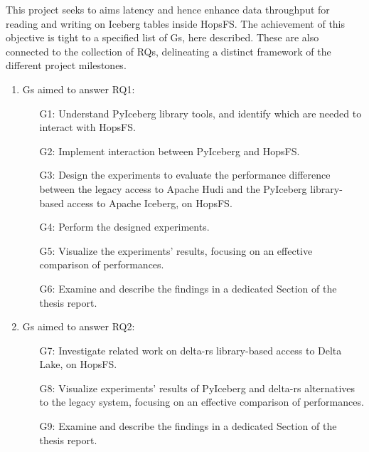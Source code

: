 This project seeks to aims latency and hence enhance data throughput for reading and writing on Iceberg tables inside \gls{HopsFS}. The achievement of this objective is tight to a specified list of \glspl{G}, here described. These are also connected to the collection of \glspl{RQ}, delineating a distinct framework of the different project milestones.

\begin{enumerate}
    \item \glspl{G} aimed to answer RQ1: 
        \begin{enumerate}
            \item[G1:] Understand PyIceberg library tools, and identify which are needed to interact with \gls{HopsFS}.
            \item[G2:] Implement interaction between PyIceberg and \gls{HopsFS}. 
            \item[G3:] Design the experiments to evaluate the performance difference between the legacy access to Apache Hudi and the PyIceberg library-based access to Apache Iceberg, on \gls{HopsFS}. 
            \item[G4:] Perform the designed experiments.
            \item[G5:] Visualize the experiments' results, focusing on an effective comparison of performances.
            \item[G6:] Examine and describe the findings in a dedicated Section of the thesis report.
        \end{enumerate}
    \item \glspl{G} aimed to answer RQ2:
        \begin{enumerate}
            \item[G7:] Investigate related work on delta-rs library-based access to Delta Lake, on \gls{HopsFS}.
            \item[G8:] Visualize experiments' results of PyIceberg and delta-rs alternatives to the legacy system, focusing on an effective comparison of performances.
            \item[G9:] Examine and describe the findings in a dedicated Section of the thesis report.
        \end{enumerate}
\end{enumerate}

